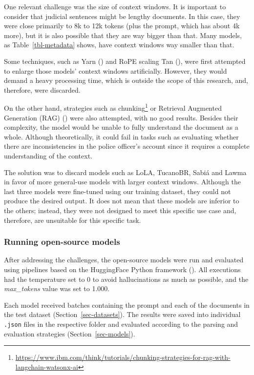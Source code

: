 \documentclass[
  12pt,
]{article}
\begin{document}
One relevant challenge was the size of context windows. It is important
to consider that judicial sentences might be lengthy documents. In this
case, they were close primarily to 8k to 12k tokens (plus the prompt,
which has about 4k more), but it is also possible that they are way
bigger than that. Many models, as Table~\ref{tbl-metadata} shows, have
context windows way smaller than that.

Some techniques, such as Yarn () and RoPE scaling Tan
(), were first attempted to
enlarge those models' context windows artificially. However, they would
demand a heavy processing time, which is outside the scope of this
research, and, therefore, were discarded.

On the other hand, strategies such as chunking\footnote{\url{https://www.ibm.com/think/tutorials/chunking-strategies-for-rag-with-langchain-watsonx-ai}}
or Retrieval Augmented Generation (RAG)
() were
also attempted, with no good results. Besides their complexity, the
model would be unable to fully understand the document as a whole.
Although theoretically, it could fail in tasks such as evaluating
whether there are inconsistencies in the police officer's account since
it requires a complete understanding of the context.

The solution was to discard models such as LoLA, TucanoBR, Sabiá and
Lawma in favor of more general-use models with larger context windows.
Although the last three models were fine-tuned using our training
dataset, they could not produce the desired output. It does not mean
that these models are inferior to the others; instead, they were not
designed to meet this specific use case and, therefore, are unsuitable
for this specific task.

\subsubsection{Running open-source
models}\label{running-open-source-models}

After addressing the challenges, the open-source models were run and
evaluated using pipelines based on the HuggingFace Python framework
(). All
executions had the temperature set to 0 to avoid hallucinations as much
as possible, and the \emph{max\_tokens} value was set to 1.000.

Each model received batches containing the prompt and each of the
documents in the test dataset (Section~\ref{sec-datasets}). The results
were saved into individual \texttt{.json} files in the respective folder
and evaluated according to the parsing and evaluation strategies
(Section~\ref{sec-models}).
\end{document}
